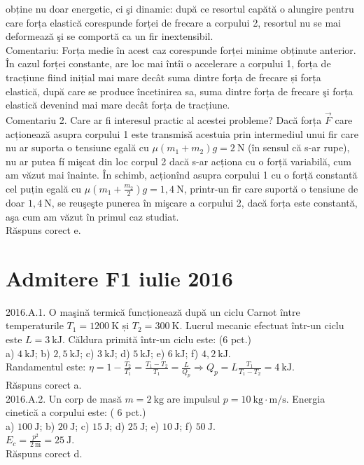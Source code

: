 obține nu doar energetic, ci şi dinamic: după ce resortul capătă o alungire pentru care forța elastică corespunde forței de frecare a corpului 2, resortul nu se mai deformează şi se comportă ca un fir inextensibil.\\ Comentariu: Forța medie în acest caz corespunde forței minime obținute anterior. În cazul forței constante, are loc mai întîi o accelerare a corpului 1, forța de tracțiune fiind inițial mai mare decât suma dintre forța de frecare și forța elastică, după care se produce încetinirea sa, suma dintre forța de frecare şi forța elastică devenind mai mare decât forța de tracțiune.\\ Comentariu 2. Care ar fi interesul practic al acestei probleme? Dacă forța $\vec{F}$ care acționează asupra corpului 1 este transmisă acestuia prin intermediul unui fir care nu ar suporta o tensiune egală cu $\mu\left(m_{1}+m_{2}\right) g=2 \mathrm{~N}$ (în sensul că s-ar rupe), nu ar putea fí mişcat din loc corpul 2 dacă s-ar acționa cu o forță variabilă, cum am văzut mai înainte. În schimb, acționînd asupra corpului 1 cu o forță constantă cel puțin egală cu $\mu\left(m_{1}+\frac{m_{2}}{2}\right)g=1,4 \mathrm{~N}$, printr-un fir care suportă o tensiune de doar $1,4 \mathrm{~N}$, se reuşeşte punerea în mişcare a corpului 2, dacă forța este constantă, aşa cum am văzut în primul caz studiat.\\ Răspuns corect e.\\

\section{Admitere F1 iulie 2016}

2016.A.1. O maşină termică funcționează după un ciclu Carnot între temperaturile $T_{1}=1200 \mathrm{~K}$ și $T_{2}=300 \mathrm{~K}$. Lucrul mecanic efectuat într-un ciclu este $L=3 \mathrm{~kJ}$. Căldura primită într-un ciclu este: (6 pct.)\\ a) $4 \mathrm{~kJ}$; b) $2,5 \mathrm{~kJ}$; c) $3 \mathrm{~kJ}$; d) $5 \mathrm{~kJ}$; e) $6 \mathrm{~kJ}$; f) $4,2 \mathrm{~kJ}$.\\ Randamentul este: $\eta=1-\frac{T_{2}}{T_{1}}=\frac{T_{1}-T_{2}}{T_{1}}=\frac{L}{Q_{p}} \Rightarrow Q_{p}=L \frac{T_{1}}{T_{1}-T_{2}}=4 \mathrm{~kJ}$.\\ Răspuns corect a.\\

2016.A.2. Un corp de masă $m=2 \mathrm{~kg}$ are impulsul $p=10 \mathrm{~kg} \cdot \mathrm{m} / \mathrm{s}$. Energia cinetică a corpului este: ( 6 pct.)\\ a) $100 \mathrm{~J}$; b) $20 \mathrm{~J}$; c) $15 \mathrm{~J}$; d) $25 \mathrm{~J}$; e) $10 \mathrm{~J}$; f) $50 \mathrm{~J}$.\\ $E_{c}=\frac{p^{2}}{2 \mathrm{~m}}=25 \mathrm{~J}$.\\ Răspuns corect d.\\

